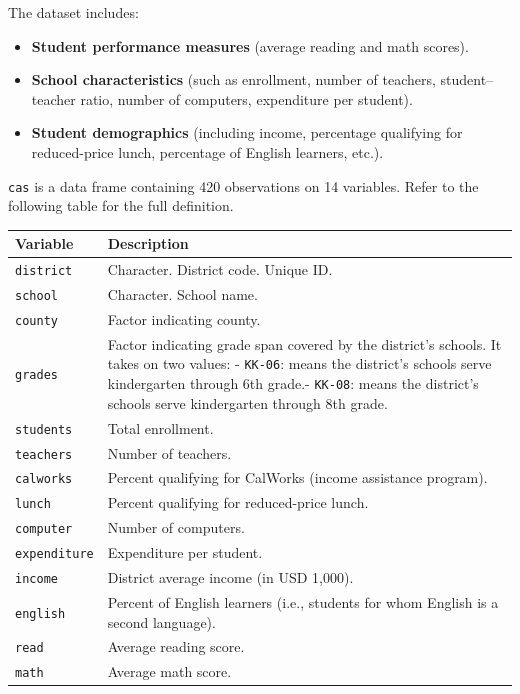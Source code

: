 \documentclass[
  12pt,
  letterpaper,
]{scrbook}
\providecommand{\tightlist}{%
  \setlength{\itemsep}{0pt}\setlength{\parskip}{0pt}}
\renewcommand{\tightlist}{\setlength{\itemsep}{0.5\baselineskip}\setlength{\parskip}{0.2\baselineskip}}
\theoremstyle{plain}
\theoremstyle{definition}
\theoremstyle{remark}
\begin{document}
The dataset includes:

\begin{itemize}
\tightlist
\item
  \textbf{Student performance measures} (average reading and math
  scores).
\item
  \textbf{School characteristics} (such as enrollment, number of
  teachers, student--teacher ratio, number of computers, expenditure per
  student).
\item
  \textbf{Student demographics} (including income, percentage qualifying
  for reduced-price lunch, percentage of English learners, etc.).
\end{itemize}

\texttt{cas} is a data frame containing 420 observations on 14
variables. Refer to the following table for the full definition.

\begin{longtable}[]{@{}
  >{\raggedright\arraybackslash}p{}
  >{\raggedright\arraybackslash}p{}@{}}
\toprule\noalign{}
\begin{minipage}[b]{\linewidth}\raggedright
Variable
\end{minipage} & \begin{minipage}[b]{\linewidth}\raggedright
Description
\end{minipage} \\
\midrule\noalign{}
\endhead
\bottomrule\noalign{}
\endlastfoot
\texttt{district} & Character. District code. Unique ID. \\
\texttt{school} & Character. School name. \\
\texttt{county} & Factor indicating county. \\
\texttt{grades} & Factor indicating grade span covered by the district's
schools. It takes on two values: - \texttt{KK-06}: means the district's
schools serve kindergarten through 6th grade.- \texttt{KK-08}: means the
district's schools serve kindergarten through 8th grade. \\
\texttt{students} & Total enrollment. \\
\texttt{teachers} & Number of teachers. \\
\texttt{calworks} & Percent qualifying for CalWorks (income assistance
program). \\
\texttt{lunch} & Percent qualifying for reduced-price lunch. \\
\texttt{computer} & Number of computers. \\
\texttt{expenditure} & Expenditure per student. \\
\texttt{income} & District average income (in USD 1,000). \\
\texttt{english} & Percent of English learners (i.e., students for whom
English is a second language). \\
\texttt{read} & Average reading score. \\
\texttt{math} & Average math score. \\
\end{longtable}
\end{document}
